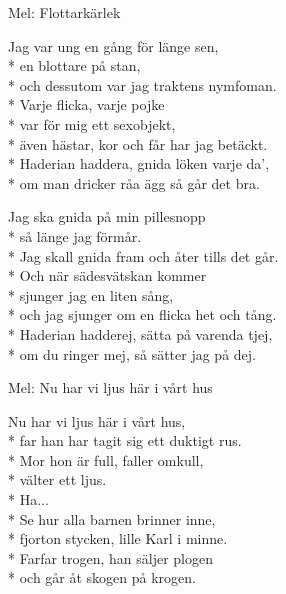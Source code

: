 \begin{SongText}[Blottarkärlek]
    \begin{SongInfo}
        Mel: Flottarkärlek
    \end{SongInfo}
    \begin{SongVerse}
        Jag var ung en gång för länge sen,\\*%
        en blottare på stan,\\*%
        och dessutom var jag traktens nymfoman.\\*%
        Varje flicka, varje pojke\\*%
        var för mig ett sexobjekt,\\*%
        även hästar, kor och får har jag betäckt.\\*%
        Haderian haddera, gnida löken varje da',\\*%
        om man dricker råa ägg så går det bra.
    \end{SongVerse}
    \begin{SongVerse}
        Jag ska gnida på min pillesnopp\\*%
        så länge jag förmår.\\*%
        Jag skall gnida fram och åter tills det går.\\*%
        Och när sädesvätskan kommer\\*%
        sjunger jag en liten sång,\\*%
        och jag sjunger om en flicka het och tång.\\*%
        Haderian hadderej, sätta på varenda tjej,\\*%
        om du ringer mej, så sätter jag på dej.
    \end{SongVerse}
\end{SongText}
\begin{SongText}
    \begin{SongInfo}
        Mel: Nu har vi ljus här i vårt hus
    \end{SongInfo}
    \begin{SongVerse}
        Nu har vi ljus här i vårt hus,\\*%
        far han har tagit sig ett duktigt rus.\\*%
        Mor hon är full, faller omkull,\\*%
        välter ett ljus.\\*%
        Ha...\\*%
        Se hur alla barnen brinner inne,\\*%
        fjorton stycken, lille Karl i minne.\\*%
        Farfar trogen, han säljer plogen\\*%
        och går åt skogen på krogen.
    \end{SongVerse}
\end{SongText}
\newpage